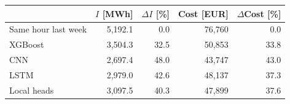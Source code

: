 \begin{tabular}{lrrrr}
\toprule
 & $I$ [MWh] & $\Delta I$ [\%] & Cost [EUR] & $\Delta$Cost [\%] \\
\midrule
Same hour last week & 5,192.1 & 0.0 & 76,760 & 0.0 \\
XGBoost & 3,504.3 & 32.5 & 50,853 & 33.8 \\
CNN & 2,697.4 & 48.0 & 43,747 & 43.0 \\
LSTM & 2,979.0 & 42.6 & 48,137 & 37.3 \\
Local heads & 3,097.5 & 40.3 & 47,899 & 37.6 \\
\bottomrule
\end{tabular}
